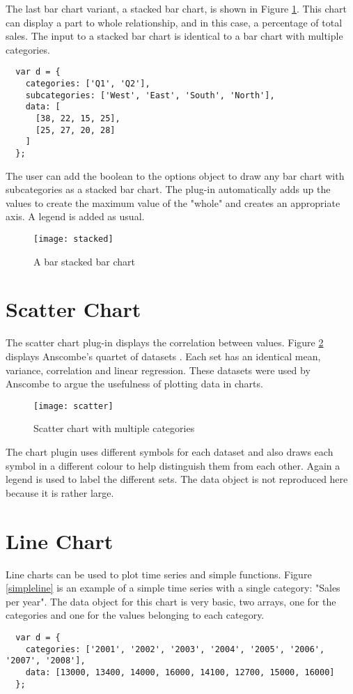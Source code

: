 The last bar chart variant, a stacked bar chart, is shown in Figure \ref{stackedbar}. This chart can display a part to whole relationship, and in this case, a percentage of total sales. The input to a stacked bar chart is identical to a bar chart with multiple categories.

\begin{verbatim}
  var d = {
    categories: ['Q1', 'Q2'],
    subcategories: ['West', 'East', 'South', 'North'],
    data: [
      [38, 22, 15, 25],
      [25, 27, 20, 28]
    ]
  };
\end{verbatim}

The user can add the  boolean to the options object to draw any bar chart with subcategories as a stacked bar chart. The plug-in automatically adds up the values to create the maximum value of the "whole" and creates an appropriate axis. A legend is added as usual.

\begin{figure}[H]
	\centering
	\texttt{[image: stacked]}
	\caption{A bar stacked bar chart}
	\label{stackedbar}
\end{figure}


\section{Scatter Chart}

The scatter chart plug-in displays the correlation between values. Figure \ref{scatter} displays Anscombe's quartet of datasets \cite{anscombe73, tufte01}. Each set has an identical mean, variance, correlation and linear regression. These datasets were used by Anscombe to argue the usefulness of plotting data in charts.

\begin{figure}[H]
	\centering
	\texttt{[image: scatter]}
	\caption{Scatter chart with multiple categories}
	\label{scatter}
\end{figure}

The chart plugin uses different symbols for each dataset and also draws each symbol in a different colour to help distinguish them from each other. Again a legend is used to label the different sets. The data object is not reproduced here because it is rather large.

\section{Line Chart}
Line charts can be used to plot time series and simple functions. Figure \ref{simpleline} is an example of a simple time series with a single category: "Sales per year". The data object for this chart is very basic, two arrays, one for the categories and one for the values belonging to each category.
\begin{verbatim}
  var d = {
    categories: ['2001', '2002', '2003', '2004', '2005', '2006', '2007', '2008'],
    data: [13000, 13400, 14000, 16000, 14100, 12700, 15000, 16000]
  };
\end{verbatim}

